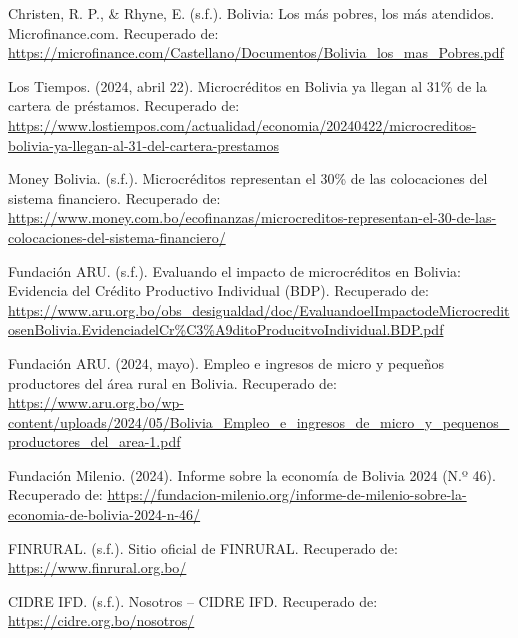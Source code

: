 \documentclass[Royal,times,sageh]{sagej}
\begin{document}
Christen, R. P., \& Rhyne, E. (s.f.). Bolivia: Los más pobres, los más
atendidos. Microfinance.com. Recuperado de:
\url{https://microfinance.com/Castellano/Documentos/Bolivia_los_mas_Pobres.pdf}

Los Tiempos. (2024, abril 22). Microcréditos en Bolivia ya llegan al
31\% de la cartera de préstamos. Recuperado de:
\url{https://www.lostiempos.com/actualidad/economia/20240422/microcreditos-bolivia-ya-llegan-al-31-del-cartera-prestamos}

Money Bolivia. (s.f.). Microcréditos representan el 30\% de las
colocaciones del sistema financiero. Recuperado de:
\url{https://www.money.com.bo/ecofinanzas/microcreditos-representan-el-30-de-las-colocaciones-del-sistema-financiero/}

Fundación ARU. (s.f.). Evaluando el impacto de microcréditos en Bolivia:
Evidencia del Crédito Productivo Individual (BDP). Recuperado de:
\url{https://www.aru.org.bo/obs_desigualdad/doc/EvaluandoelImpactodeMicrocreditosenBolivia.EvidenciadelCr\%C3\%A9ditoProducitvoIndividual.BDP.pdf}

Fundación ARU. (2024, mayo). Empleo e ingresos de micro y pequeños
productores del área rural en Bolivia. Recuperado de:
\url{https://www.aru.org.bo/wp-content/uploads/2024/05/Bolivia_Empleo_e_ingresos_de_micro_y_pequenos_productores_del_area-1.pdf}

Fundación Milenio. (2024). Informe sobre la economía de Bolivia 2024
(N.º 46). Recuperado de:
\url{https://fundacion-milenio.org/informe-de-milenio-sobre-la-economia-de-bolivia-2024-n-46/}

FINRURAL. (s.f.). Sitio oficial de FINRURAL. Recuperado de:
\url{https://www.finrural.org.bo/}

CIDRE IFD. (s.f.). Nosotros -- CIDRE IFD. Recuperado de:
\url{https://cidre.org.bo/nosotros/}



\end{document}

